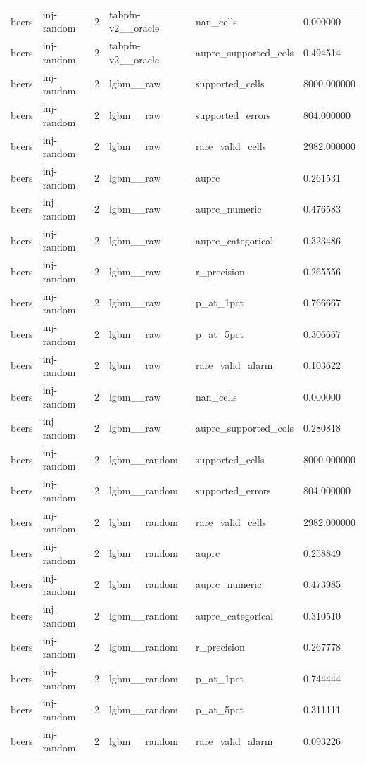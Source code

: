 \begin{tabular}{llllll}
beers & inj-random & 2 & tabpfn-v2\_\_oracle & nan\_cells & 0.000000 \\
beers & inj-random & 2 & tabpfn-v2\_\_oracle & auprc\_supported\_cols & 0.494514 \\
beers & inj-random & 2 & lgbm\_\_raw & supported\_cells & 8000.000000 \\
beers & inj-random & 2 & lgbm\_\_raw & supported\_errors & 804.000000 \\
beers & inj-random & 2 & lgbm\_\_raw & rare\_valid\_cells & 2982.000000 \\
beers & inj-random & 2 & lgbm\_\_raw & auprc & 0.261531 \\
beers & inj-random & 2 & lgbm\_\_raw & auprc\_numeric & 0.476583 \\
beers & inj-random & 2 & lgbm\_\_raw & auprc\_categorical & 0.323486 \\
beers & inj-random & 2 & lgbm\_\_raw & r\_precision & 0.265556 \\
beers & inj-random & 2 & lgbm\_\_raw & p\_at\_1pct & 0.766667 \\
beers & inj-random & 2 & lgbm\_\_raw & p\_at\_5pct & 0.306667 \\
beers & inj-random & 2 & lgbm\_\_raw & rare\_valid\_alarm & 0.103622 \\
beers & inj-random & 2 & lgbm\_\_raw & nan\_cells & 0.000000 \\
beers & inj-random & 2 & lgbm\_\_raw & auprc\_supported\_cols & 0.280818 \\
beers & inj-random & 2 & lgbm\_\_random & supported\_cells & 8000.000000 \\
beers & inj-random & 2 & lgbm\_\_random & supported\_errors & 804.000000 \\
beers & inj-random & 2 & lgbm\_\_random & rare\_valid\_cells & 2982.000000 \\
beers & inj-random & 2 & lgbm\_\_random & auprc & 0.258849 \\
beers & inj-random & 2 & lgbm\_\_random & auprc\_numeric & 0.473985 \\
beers & inj-random & 2 & lgbm\_\_random & auprc\_categorical & 0.310510 \\
beers & inj-random & 2 & lgbm\_\_random & r\_precision & 0.267778 \\
beers & inj-random & 2 & lgbm\_\_random & p\_at\_1pct & 0.744444 \\
beers & inj-random & 2 & lgbm\_\_random & p\_at\_5pct & 0.311111 \\
beers & inj-random & 2 & lgbm\_\_random & rare\_valid\_alarm & 0.093226 \\

\end{tabular}
